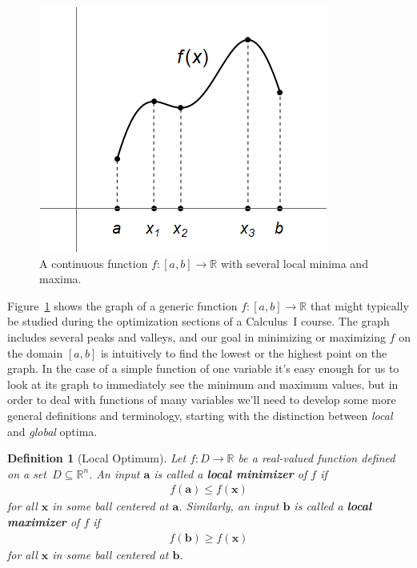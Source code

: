 \documentclass[11pt]{article}
\newtheorem*{definition}{Definition} %
\theoremstyle{definition} %
\begin{document}
\begin{figure}[h]
	\centering
	\includegraphics[height=0.225\textheight]{figures/local_extrema.png}
	\caption{A continuous function $f : [a,b] \to \mathbb{R}$ with several local minima and maxima.}
	\label{fig:localextrema}
\end{figure}

Figure~\ref{fig:localextrema} shows the graph of a generic function $f : [a,b] \to \mathbb{R}$ that might typically be studied during the optimization sections of a Calculus~I course. The graph includes several peaks and valleys, and our goal in minimizing or maximizing $f$ on the domain $[a,b]$ is intuitively to find the lowest or the highest point on the graph. In the case of a simple function of one variable it's easy enough for us to look at its graph to immediately see the minimum and maximum values, but in order to deal with functions of many variables we'll need to develop some more general definitions and terminology, starting with the distinction between \textit{local} and \textit{global} optima.

\begin{definition}[Local Optimum]
	Let $f : D \to \mathbb{R}$ be a real-valued function defined on a set~\mbox{$D \subseteq \mathbb{R}^n$}. An input $\mathbf{a}$ is called a \textbf{local minimizer} of $f$ if
	\begin{align*}
		f(\mathbf{a}) \le f(\mathbf{x})
	\end{align*}
	for all $\mathbf{x}$ in some ball centered at $\mathbf{a}$. Similarly, an input $\mathbf{b}$ is called a \textbf{local maximizer} of $f$ if
	\begin{align*}
		f(\mathbf{b}) \ge f(\mathbf{x})
	\end{align*}
	for all $\mathbf{x}$ in some ball centered at $\mathbf{b}$.
\end{definition}
\end{document}

